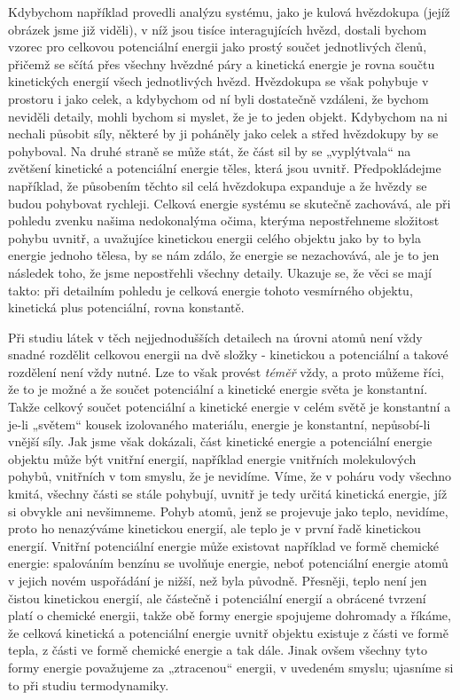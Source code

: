 {    Kdybychom například provedli analýzu systému, jako je kulová hvězdokupa (jejíž obrázek jsme již 
    viděli), v níž jsou tisíce interagujících hvězd, dostali bychom vzorec pro celkovou potenciální 
    energii jako prostý součet jednotlivých členů, přičemž se sčítá přes všechny hvězdné páry a 
    kinetická energie je rovna součtu kinetických energií všech jednotlivých hvězd. Hvězdokupa se 
    však pohybuje v prostoru i jako celek, a kdybychom od ní byli dostatečně vzdáleni, že bychom 
    neviděli detaily, mohli bychom si myslet, že je to jeden objekt. Kdybychom na ni nechali 
    působit síly, některé by ji poháněly jako celek a střed hvězdokupy by se pohyboval. Na druhé 
    straně se může stát, že část sil by se „vyplýtvala“ na zvětšení kinetické a potenciální energie 
    těles, která jsou uvnitř. Předpokládejme například, že působením těchto sil celá hvězdokupa 
    expanduje a že hvězdy se budou pohybovat rychleji. Celková energie systému se skutečně 
    zachovává, ale při pohledu zvenku našima nedokonalýma očima, kterýma nepostřehneme složitost 
    pohybu uvnitř, a uvažujíce kinetickou energii celého objektu jako by to byla energie jednoho 
    tělesa, by se nám zdálo, že energie se nezachovává, ale je to jen následek toho, že jsme 
    nepostřehli všechny detaily. Ukazuje se, že věci se mají takto: při detailním pohledu je 
    celková energie tohoto vesmírného objektu, kinetická plus potenciální, rovna konstantě.
    
    Při studiu látek v těch nejjednodušších detailech na úrovni atomů není vždy snadné rozdělit 
    celkovou energii na dvě složky - kinetickou a potenciální a takové rozdělení není vždy nutné. 
    Lze to však provést \emph{téměř} vždy, a proto můžeme říci, že to je možné a že součet 
    potenciální a kinetické energie světa je konstantní. Takže celkový součet potenciální a 
    kinetické energie v celém světě je konstantní a je-li „světem“ kousek izolovaného materiálu, 
    energie je konstantní, nepůsobí-li vnější síly. Jak jsme však dokázali, část kinetické energie 
    a potenciální energie objektu může být vnitřní energií, například energie vnitřních 
    molekulových pohybů, vnitřních v tom smyslu, že je nevidíme. Víme, že v poháru vody všechno 
    kmitá, všechny části se stále pohybují, uvnitř je tedy určitá kinetická energie, jíž si obvykle 
    ani nevšimneme. Pohyb atomů, jenž se projevuje jako teplo, nevidíme, proto ho nenazýváme 
    kinetickou energií, ale teplo je v první řadě kinetickou energií. Vnitřní potenciální energie 
    může existovat například ve formě chemické energie: spalováním benzínu se uvolňuje energie, 
    neboť potenciální energie atomů v jejich novém uspořádání je nižší, než byla původně. Přesněji, 
    teplo není jen čistou kinetickou energií, ale částečně i potenciální energií a obrácené tvrzení 
    platí o chemické energii, takže obě formy energie spojujeme dohromady a říkáme, že celková 
    kinetická a potenciální energie uvnitř objektu existuje z části ve formě tepla, z části ve 
    formě chemické energie a tak dále. Jinak ovšem všechny tyto formy energie považujeme za 
    „ztracenou“ energii, v uvedeném smyslu; ujasníme si to při studiu termodynamiky.
    
}
